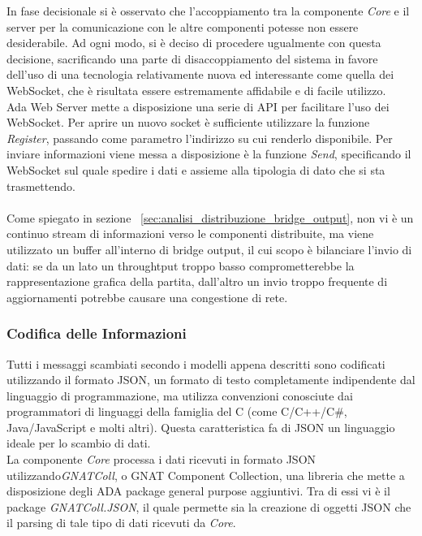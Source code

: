 In fase decisionale si è osservato che l'accoppiamento tra la componente \emph{Core} e il server per la comunicazione con le altre componenti potesse non essere desiderabile. Ad ogni modo, si è deciso di procedere ugualmente con questa decisione, sacrificando una parte di disaccoppiamento del sistema in favore dell'uso di una tecnologia relativamente nuova ed interessante come quella dei WebSocket, che è risultata essere estremamente affidabile e di facile utilizzo.\\

Ada Web Server mette a disposizione una serie di API per facilitare l'uso dei WebSocket. Per aprire un nuovo socket \`{e} sufficiente utilizzare la funzione \emph{Register}, passando come parametro l'indirizzo su cui renderlo disponibile. Per inviare informazioni viene messa a disposizione \`{e} la funzione \emph{Send}, specificando il WebSocket sul quale spedire i dati e assieme alla tipologia di dato che si sta trasmettendo.\\\\

Come spiegato in sezione ~\ref{sec:analisi_distribuzione_bridge_output}, non vi \`{e} un continuo stream di informazioni verso le componenti distribuite, ma viene utilizzato un buffer all'interno di bridge output, il cui scopo \`{e} bilanciare l'invio di dati: se da un lato un throughtput troppo basso comprometterebbe la rappresentazione grafica della partita, dall'altro un invio troppo frequente di aggiornamenti potrebbe causare una congestione di rete.

\subsubsection{Codifica delle Informazioni}
Tutti i messaggi scambiati secondo i modelli appena descritti sono codificati utilizzando il formato JSON, un formato di testo completamente indipendente dal linguaggio di programmazione, ma utilizza convenzioni conosciute dai programmatori di linguaggi della famiglia del C (come C/C++/C\#, Java/JavaScript e molti altri). Questa caratteristica fa di JSON un linguaggio ideale per lo scambio di dati.\\

La componente \emph{Core} processa i dati ricevuti in formato JSON utilizzando\emph{GNATColl}, o GNAT Component Collection, una libreria che mette a disposizione degli ADA package general purpose aggiuntivi. Tra di essi vi \`{e} il package \emph{GNATColl.JSON}, il quale permette sia la creazione di oggetti JSON che il parsing di tale tipo di dati ricevuti da \emph{Core}.

